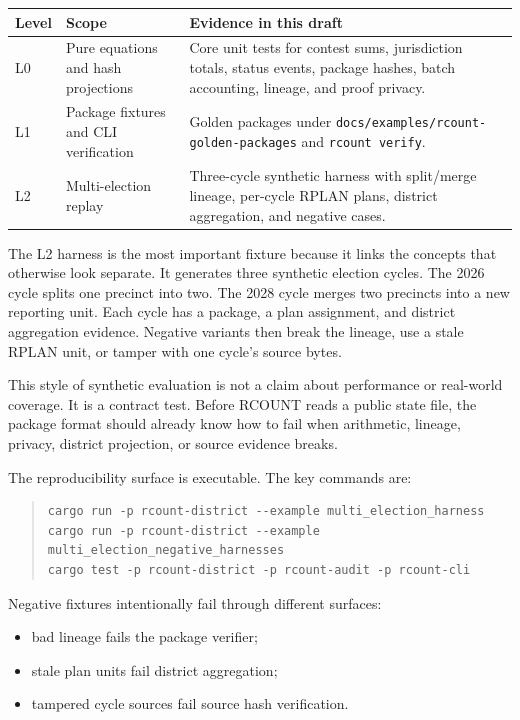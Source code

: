 \begin{center}
\small
\begin{tabularx}{\textwidth}{llX}
\toprule
Level & Scope & Evidence in this draft \\
\midrule
L0 & Pure equations and hash projections & Core unit tests for contest sums, jurisdiction totals, status events, package hashes, batch accounting, lineage, and proof privacy. \\
L1 & Package fixtures and CLI verification & Golden packages under \texttt{docs/examples/rcount-golden-packages} and \texttt{rcount verify}. \\
L2 & Multi-election replay & Three-cycle synthetic harness with split/merge lineage, per-cycle RPLAN plans, district aggregation, and negative cases. \\
\bottomrule
\end{tabularx}
\end{center}

The L2 harness is the most important fixture because it links the concepts that
otherwise look separate. It generates three synthetic election cycles. The 2026
cycle splits one precinct into two. The 2028 cycle merges two precincts into a
new reporting unit. Each cycle has a package, a plan assignment, and district
aggregation evidence. Negative variants then break the lineage, use a stale
RPLAN unit, or tamper with one cycle's source bytes.

This style of synthetic evaluation is not a claim about performance or
real-world coverage. It is a contract test. Before RCOUNT reads a public state
file, the package format should already know how to fail when arithmetic,
lineage, privacy, district projection, or source evidence breaks.

The reproducibility surface is executable. The key commands are:
\begin{quote}
\small
\begin{verbatim}
cargo run -p rcount-district --example multi_election_harness
cargo run -p rcount-district --example multi_election_negative_harnesses
cargo test -p rcount-district -p rcount-audit -p rcount-cli
\end{verbatim}
\end{quote}
Negative fixtures intentionally fail through different surfaces:
\begin{itemize}
\item bad lineage fails the package verifier;
\item stale plan units fail district aggregation;
\item tampered cycle sources fail source hash verification.
\end{itemize}
